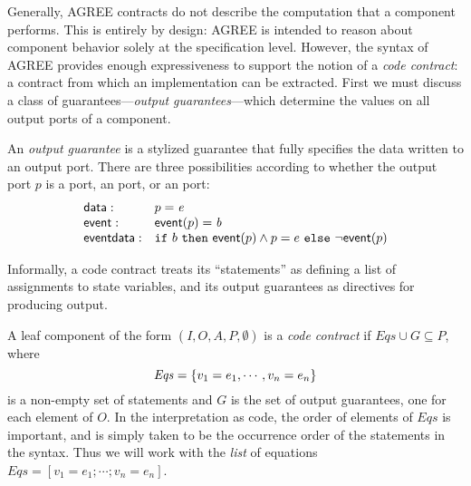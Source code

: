 

Generally, AGREE contracts do not describe the computation that a
component performs. This is entirely by design: AGREE is intended to
reason about component behavior solely at the specification
level. However, the syntax of AGREE provides enough expressiveness to
support the notion of a \emph{code contract}: a contract from which an
implementation can be extracted. First we must discuss a class of
guarantees---\emph{output guarantees}---which determine the values on
all output ports of a component.

\begin{definition}
An \emph{output guarantee} is a stylized guarantee that fully
specifies the data written to an output port. There are three
possibilities according to whether the output port $p$ is
a  port, an  port, or an 
port:
\[
\begin{array}{ll}
\mathsf{data}: &  p = \mathit{e} \\
\mathsf{event}: &  \mathsf{event} (p) = \mathit{b} \\
\mathsf{event data}: & \mbox{$\mathtt{if}\ {b}\ \mathtt{then}\ {\mathsf{event} (p) \land p = e}\ \mathtt{else}\ {\neg \mathsf{event}(p)}$} \\
\end{array}
\]
\end{definition}

Informally, a code contract treats its  ``statements'' as
defining a list of assignments to state variables, and its output
guarantees as directives for producing output.

\begin{definition} A
  leaf component of the form $(I,O,A,P,\emptyset)$ is a
  \emph{code contract} if $\mathit{Eqs} \cup G \subseteq P$, where
\[\mathit{Eqs} = \{ {v_1 = e_1, \cdots , v_n = e_n} \} \] is a non-empty set
of  statements and $G$ is the set of output guarantees, one for
each element of $O$. In the interpretation as code, the order of
elements of $\mathit{Eqs}$ is important, and is simply taken to be the
occurrence order of the  statements in the syntax. Thus we
will work with the
\emph{list} of equations $\mathit{Eqs} = [v_1 = e_1; \cdots ; v_n = e_n]$.
\end{definition}


